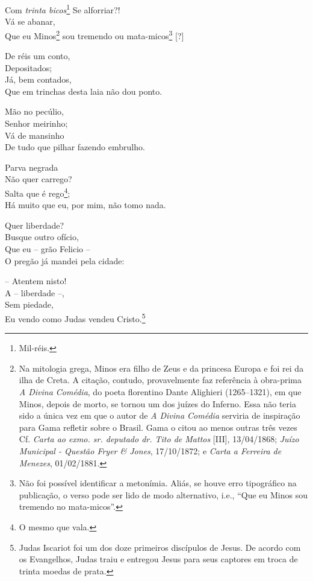 Com \emph{trinta bicos}\footnote{ Mil-réis.}\emph{\hfill\break
} Se alforriar?!\\
Vá se abanar,\\
Que eu Minos\footnote{ Na mitologia grega, Minos era filho de Zeus e da
  princesa Europa e foi rei da ilha de Creta. A citação, contudo,
  provavelmente faz referência à obra-prima \emph{A Divina Comédia}, do
  poeta florentino Dante Alighieri (1265--1321), em que Minos, depois de
  morto, se tornou um dos juízes do Inferno. Essa não teria sido a única
  vez em que o autor de \emph{A Divina Comédia} serviria de inspiração
  para Gama refletir sobre o Brasil. Gama o citou ao menos outras três
  vezes Cf. \emph{Carta ao exmo. sr. deputado dr. Tito de Mattos}
  {[}III{]}, 13/04/1868; \emph{Juízo Municipal - Questão Fryer \&
  Jones}, 17/10/1872; e \emph{Carta a Ferreira de Menezes}, 01/02/1881.}
sou tremendo ou mata-micos\footnote{ Não foi possível identificar a
  metonímia. Aliás, se houve erro tipográfico na publicação, o verso
  pode ser lido de modo alternativo, i.e., ``Que eu Minos sou tremendo no
  mata-micos''.} {[}?{]}

De réis um conto,\\
Depositados;\\
Já, bem contados,\\
Que em trinchas desta laia não dou ponto.

Mão no pecúlio,\\
Senhor meirinho;\\
Vá de mansinho\\
De tudo que pilhar fazendo embrulho.

Parva negrada\\
Não quer carrego?\\
Salta que é rego\footnote{ O mesmo que vala.};\\
Há muito que eu, por mim, não tomo nada.

Quer liberdade?\\
Busque outro ofício,\\
Que eu -- grão Felicio --\\
O pregão já mandei pela cidade:

-- Atentem nisto!\\
A -- liberdade --,\\
Sem piedade,\\
Eu vendo como Judas vendeu Cristo.\footnote{ Judas Iscariot foi um dos
  doze primeiros discípulos de Jesus. De acordo com os Evangelhos, Judas
  traiu e entregou Jesus para seus captores em troca de trinta moedas de
  prata.}

